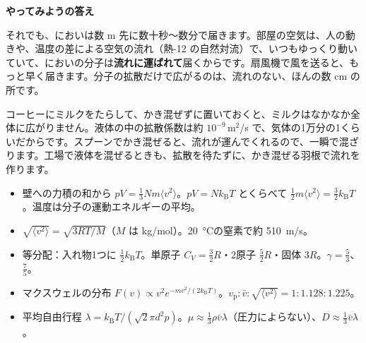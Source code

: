 \noindent\textbf{やってみようの答え}\par\nobreak
それでも、においは数 m 先に数十秒〜数分で届きます。部屋の空気は、人の動きや、温度の差による空気の流れ（熱-12 の自然対流）で、いつもゆっくり動いていて、においの分子は\textbf{流れに運ばれて}届くからです。扇風機で風を送ると、もっと早く届きます。分子の拡散だけで広がるのは、流れのない、ほんの数 cm の所です。

\begin{phmijika}[コーヒーにミルクを入れる]
コーヒーにミルクをたらして、かき混ぜずに置いておくと、ミルクはなかなか全体に広がりません。液体の中の拡散係数は約 $10^{-9}$\,m$^2$/s で、気体の1万分の1くらいだからです。スプーンでかき混ぜると、流れが運んでくれるので、一瞬で混ざります。工場で液体を混ぜるときも、拡散を待たずに、かき混ぜる羽根で流れを作ります。
\end{phmijika}

\begin{taisetsu}
\begin{itemize}[leftmargin=1.2\zw, itemsep=2pt, topsep=0pt, label={\color{bkNavy}●}]\raggedright
\item 壁への力積の和から $pV=\frac13Nm\langle v^2\rangle$。$pV=Nk_{\mathrm B}T$ とくらべて $\frac12m\langle v^2\rangle=\frac32k_{\mathrm B}T$。温度は分子の運動エネルギーの平均。
\item $\sqrt{\langle v^2\rangle}=\sqrt{3RT/M}$（$M$ は kg/mol）。\qty{20}{\celsius}の窒素で約 \qty{510}{m/s}。
\item 等分配：入れ物1つに $\frac12k_{\mathrm B}T$。単原子 $C_V=\frac32R$・2原子 $\frac52R$・固体 $3R$。$\gamma=\frac53$、$\frac75$。
\item マクスウェルの分布 $F(v)\propto v^2e^{-mv^2/(2k_{\mathrm B}T)}$。$v_{\mathrm p}:\bar v:\sqrt{\langle v^2\rangle}=1:1.128:1.225$。
\item 平均自由行程 $\lambda=k_{\mathrm B}T/(\sqrt2\pi d^2p)$。$\mu\approx\frac13\rho\bar v\lambda$（圧力によらない）、$D\approx\frac13\bar v\lambda$。
\end{itemize}
\end{taisetsu}

\begin{kotoba}\small
{}
\end{kotoba}
{}%

